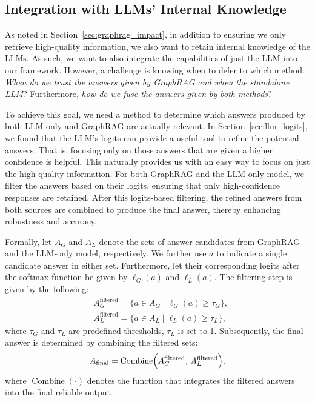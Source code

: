 \documentclass[11pt]{article}
\newcommand{\harry}[1]{{\color{orange}[Harry:#1]}}
\begin{document}
\subsection{Integration with LLMs' Internal Knowledge}
As noted in Section~\ref{sec:graphrag_impact}, in addition to ensuring we only retrieve high-quality information, we also want to retain internal knowledge of the LLMs. As such, we want to also integrate the capabilities of just the LLM into our framework. However, a challenge is knowing when to defer to which method. {\it When do we trust the answers given by GraphRAG and when the standalone LLM}? Furthermore, {\it how do we fuse the answers given by both methods}? 

To achieve this goal, we need a method to determine which answers produced by both LLM-only and GraphRAG are actually relevant. In Section~\ref{sec:llm_logits}, we found that the LLM's logits can provide a useful tool to refine the potential answers. That is, focusing only on those answers that are given a higher confidence is helpful. This naturally provides us with an easy way to focus on just the high-quality information. For both GraphRAG and the LLM-only model, we filter the answers based on their logits, ensuring that only high-confidence responses are retained. After this logits-based filtering, the refined answers from both sources are combined to produce the final answer, thereby enhancing robustness and accuracy.

Formally, let \(A_G\) and \(A_L\) denote the sets of answer candidates from GraphRAG and the LLM-only model, respectively. We further use $a$ to indicate a single candidate answer in either set. Furthermore, let their corresponding logits after the softmax function be given by \(\ell_G(a)\) and \(\ell_L(a)\). The filtering step is given by the following:
\begin{align} 
    &A_G^{\text{filtered}} = \{ a \in A_G \mid \ell_G(a) \geq \tau_G \}, \\
    &A_L^{\text{filtered}} = \{ a \in A_L \mid \ell_L(a) \geq \tau_L \},
\end{align}
where \(\tau_G\) and \(\tau_L\) are predefined thresholds, $\tau_L$ is set to 1. Subsequently, the final answer is determined by combining the filtered sets:
\begin{equation}
A_{\text{final}} = \operatorname{Combine}\Bigl( A_G^{\text{filtered}},\, A_L^{\text{filtered}} \Bigr),
\end{equation}
where \(\operatorname{Combine}(\cdot)\) denotes the function that integrates the filtered answers into the final reliable output. 
\end{document}
